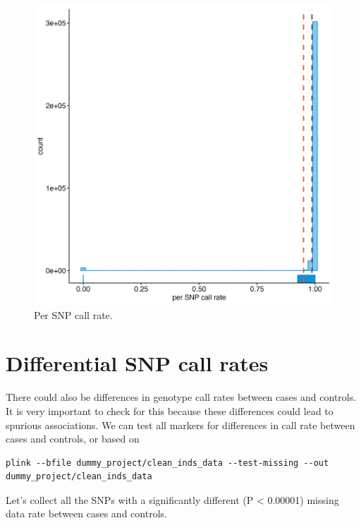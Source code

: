 \documentclass[
]{book}
\begin{document}
\begin{figure}[H]

{\centering \includegraphics[width=29.17in]{img/_gwas_dummy/show-snp-callrate} 

}

\caption{Per SNP call rate.}\label{fig:show-snp-callrate}
\end{figure}

\hypertarget{differential-snp-call-rates}{%
\section{Differential SNP call rates}\label{differential-snp-call-rates}}

There could also be differences in genotype call rates between cases and controls. It is very important to check for this because these differences could lead to spurious associations. We can test all markers for differences in call rate between cases and controls, or based on

\begin{lstlisting}
plink --bfile dummy_project/clean_inds_data --test-missing --out dummy_project/clean_inds_data
\end{lstlisting}

Let's collect all the SNPs with a significantly different (P \textless{} 0.00001) missing data rate between cases and controls.
\end{document}

